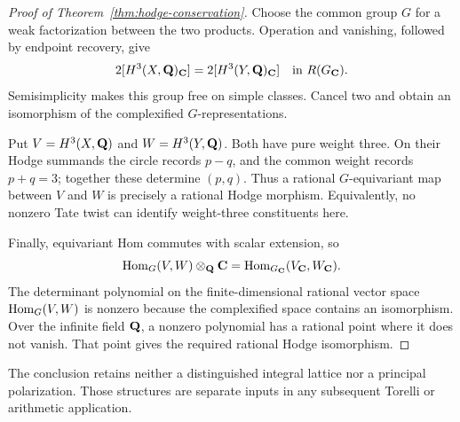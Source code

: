 \begin{proof}[Proof of Theorem~\ref{thm:hodge-conservation}]
Choose the common group $G$ for a weak factorization between the two
products. Operation and vanishing, followed by endpoint recovery, give
\[
 2[H^3(X,\mathbf Q)_\mathbf C]=2[H^3(Y,\mathbf Q)_\mathbf C]\quad\text{in }R(G_\mathbf C).
\]
Semisimplicity makes this group free on simple classes. Cancel two and
obtain an isomorphism of the complexified $G$-representations.

Put $V=H^3(X,\mathbf Q)$ and $W=H^3(Y,\mathbf Q)$. Both have pure weight three.
On their Hodge summands the circle records $p-q$, and the common weight
records $p+q=3$; together these determine $(p,q)$. Thus a rational
$G$-equivariant map between $V$ and $W$ is precisely a rational Hodge
morphism. Equivalently, no nonzero Tate twist can identify weight-three
constituents here.

Finally, equivariant Hom commutes with scalar extension, so
\[
 \operatorname{Hom}_G(V,W)\otimes_\mathbf Q\mathbf C
   =\operatorname{Hom}_{G_\mathbf C}(V_\mathbf C,W_\mathbf C).
\]
The determinant polynomial on the finite-dimensional rational vector space
$\operatorname{Hom}_G(V,W)$ is nonzero because the complexified space contains an
isomorphism. Over the infinite field $\mathbf Q$, a nonzero polynomial has a
rational point where it does not vanish. That point gives the required
rational Hodge isomorphism.
%
%
%
\end{proof}

The conclusion retains neither a distinguished integral lattice nor a
principal polarization. Those structures are separate inputs in any
subsequent Torelli or arithmetic application.

